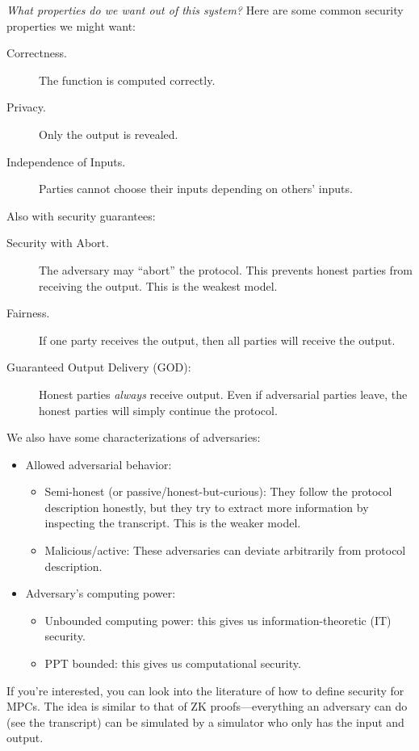 \emph{What properties do we want out of this system?} Here are some common security properties we might want:
\begin{description}
    \item[Correctness.] The function is computed correctly.
    \item[Privacy.] Only the output is revealed.
    \item[Independence of Inputs.] Parties cannot choose their inputs depending on others' inputs.
\end{description}
Also with security guarantees:
\begin{description}
    \item[Security with Abort.] The adversary may ``abort'' the protocol. This prevents honest parties from receiving the output. This is the weakest model.
    \item[Fairness.] If one party receives the output, then all parties will receive the output.
    \item[Guaranteed Output Delivery (GOD):] Honest parties \emph{always} receive output. Even if adversarial parties leave, the honest parties will simply continue the protocol.
\end{description}

We also have some characterizations of adversaries:
\begin{itemize}
    \item Allowed adversarial behavior:
          \begin{itemize}
              \item Semi-honest (or passive/honest-but-curious): They follow the protocol description honestly, but they try to extract more information by inspecting the transcript. This is the weaker model.
              \item Malicious/active: These adversaries can deviate arbitrarily from protocol description.
          \end{itemize}
    \item Adversary's computing power:
          \begin{itemize}
              \item Unbounded computing power: this gives us information-theoretic (IT) security.
              \item PPT bounded: this gives us computational security.
          \end{itemize}
\end{itemize}

If you're interested, you can look into the literature of how to define security for MPCs. The idea is similar to that of ZK proofs---everything an adversary can do (see the transcript) can be simulated by a simulator who only has the input and output.